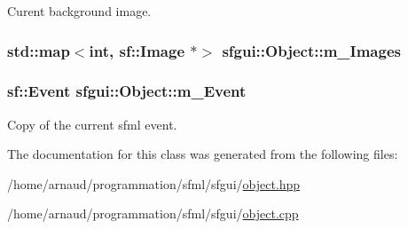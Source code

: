 Curent background image. 

\hypertarget{classsfgui_1_1Object_6d7907f767742dcfd37c1b0c349daa2d}{
\subsubsection[m\_\-Images]{\setlength{\rightskip}{0pt plus 5cm}std::map$<$int, sf::Image $\ast$$>$ {\bf sfgui::Object::m\_\-Images}}}
\label{classsfgui_1_1Object_6d7907f767742dcfd37c1b0c349daa2d}


\hypertarget{classsfgui_1_1Object_bd45c91f926c930806870ce8acbb955e}{
\subsubsection[m\_\-Event]{\setlength{\rightskip}{0pt plus 5cm}sf::Event {\bf sfgui::Object::m\_\-Event}}}
\label{classsfgui_1_1Object_bd45c91f926c930806870ce8acbb955e}


Copy of the current sfml event. 



The documentation for this class was generated from the following files:\begin{CompactItemize}
\item 
/home/arnaud/programmation/sfml/sfgui/\hyperlink{object_8hpp}{object.hpp}\item 
/home/arnaud/programmation/sfml/sfgui/\hyperlink{object_8cpp}{object.cpp}\end{CompactItemize}
